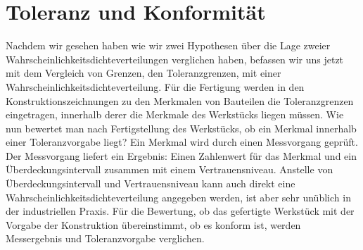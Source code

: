 \section{Toleranz und Konformität}

Nachdem wir gesehen haben wie wir zwei Hypothesen über die Lage zweier Wahrscheinlich\-keits\-dichte\-ver\-teilungen
verglichen haben, befassen wir uns jetzt mit dem Vergleich von Grenzen, den Toleranzgrenzen, mit einer
Wahrscheinlichkeitsdichteverteilung. Für die Fertigung werden in den Konstruktionszeichnungen zu den Merkmalen
von Bauteilen die Toleranzgrenzen eingetragen, innerhalb derer die Merkmale des Werkstücks liegen müssen. Wie nun
bewertet man nach Fertigstellung des Werkstücks, ob ein Merkmal innerhalb einer Toleranzvorgabe liegt? Ein Merkmal
wird durch einen Messvorgang geprüft. Der Messvorgang liefert ein Ergebnis: Einen Zahlenwert für das Merkmal und
ein Über\-deckungs\-intervall zusammen mit einem Vertrauensniveau. Anstelle von Überdeckungsintervall und Vertrauensniveau
kann auch direkt eine Wahrscheinlichkeitsdichteverteilung angegeben werden, ist aber sehr unüblich in der industriellen
Praxis. Für die Bewertung, ob das gefertigte Werkstück mit der Vorgabe der Konstruktion übereinstimmt, ob es konform ist,
werden Messergebnis und Toleranzvorgabe verglichen.

